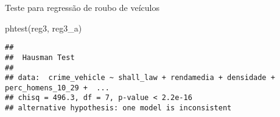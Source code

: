\documentclass[
]{article}
\newenvironment{Shaded}{\begin{snugshade}}{\end{snugshade}}
\newcommand{\FunctionTok}[1]{\textcolor[rgb]{0.00,0.00,0.00}{#1}}
\newcommand{\NormalTok}[1]{#1}
\begin{document}
Teste para regressão de roubo de veículos

\begin{Shaded}
\begin{Highlighting}[]
\FunctionTok{phtest}\NormalTok{(reg3, reg3\_a) }
\end{Highlighting}
\end{Shaded}

\begin{verbatim}
## 
##  Hausman Test
## 
## data:  crime_vehicle ~ shall_law + rendamedia + densidade + perc_homens_10_29 +  ...
## chisq = 496.3, df = 7, p-value < 2.2e-16
## alternative hypothesis: one model is inconsistent
\end{verbatim}
\end{document}
